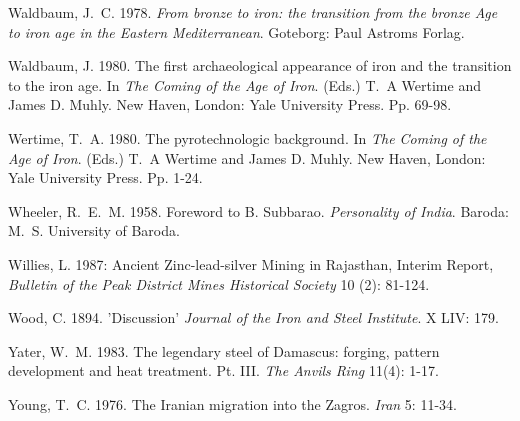 \begin{thebibliography}{99}
 Waldbaum, J.~C. 1978. \textit{From bronze to iron: the transition from the bronze Age to iron age in the Eastern Mediterranean}. Goteborg: Paul Astroms Forlag.

 Waldbaum, J. 1980. The first archaeological appearance of iron and the transition to the iron age. In \textit{The Coming of the Age of Iron}. (Eds.) T.~A Wertime and James D. Muhly. New Haven, London: Yale University Press. Pp. 69­-98.

 Wertime, T.~A. 1980. The pyrotechnologic background. In \textit{The Coming of the Age of Iron}. (Eds.) T.~A Wertime and James D. Muhly. New Haven, London: Yale University Press. Pp. 1-24.

 Wheeler, R.~E.~M. 1958. Foreword to B. Subbarao. \textit{Personality of India}. Baroda: M.~S. University of Baroda.

 Willies, L. 1987: Ancient Zinc-lead-silver Mining in Rajasthan, Interim Report, \textit{Bulletin of the Peak District Mines Historical Society} 10 (2): 81-124.

 Wood, C. 1894. 'Discussion'  \textit{Journal of the Iron and Steel Institute}.  X LIV: 179.

 Yater, W.~M. 1983. The legendary steel of Damascus: forging, pattern development and heat treatment. Pt. III. \textit{The Anvils Ring} 11(4): 1-17.

 Young, T.~C. 1976. The Iranian migration into the Zagros. \textit{Iran} 5: 11-34. 


\end{thebibliography}


\label{endchapter8}
